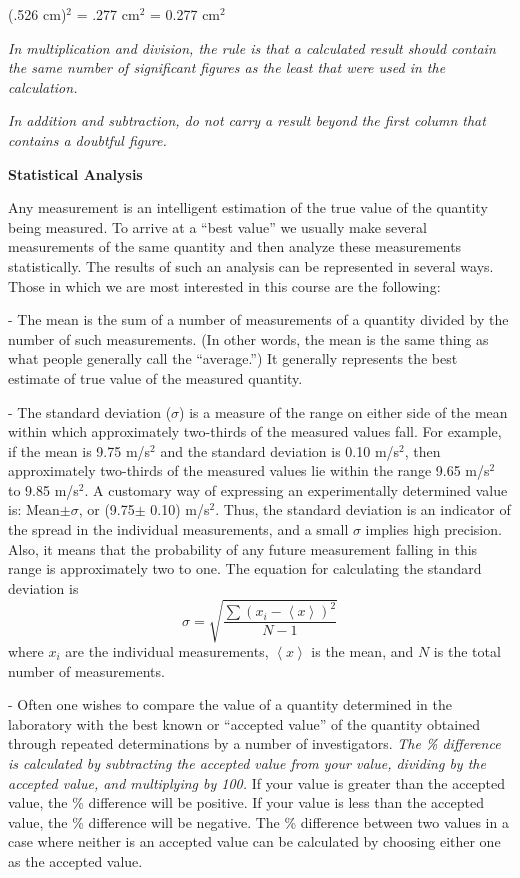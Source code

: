 {\par\centering (.526 cm)\( ^{2} \) = .277 cm\( ^{2} \)
= 0.277 cm\( ^{2} \)\par}

\textit{In multiplication and division, the rule is that a calculated result
should contain the same number of significant figures as the least that were
used in the calculation.}

\textit{In addition and subtraction, do not carry a result beyond the first
column that contains a doubtful figure.}

\textbf{Statistical Analysis} 

Any measurement is an intelligent estimation of the true value of the quantity
being measured. To arrive at a ``best value'' we usually make
several measurements of the same quantity and then analyze these measurements
statistically. The results of such an analysis can be represented in several
ways. Those in which we are most interested in this course are the following:

 - The mean is the sum of a number of measurements of a quantity
divided by the number of such measurements.
(In other words, the mean is the same thing as what people
generally call the ``average.'')
It generally represents the best estimate
of true value of the measured quantity. 

 - The standard deviation (\( \sigma  \)) is a
measure of the range on either side of the mean within which approximately two-thirds
of the measured values fall. For example, if the mean is 9.75 m/s\( ^{2} \)
and the standard deviation is 0.10 m/s\( ^{2} \), then approximately two-thirds
of the measured values lie within the range 9.65 m/s\( ^{2} \) to 9.85 m/s\( ^{2} \).
A customary way of expressing an experimentally determined value is: Mean\( \pm  \)\( \sigma  \),
or (9.75\( \pm  \) 0.10) m/s\( ^{2} \). Thus, the standard deviation is an
indicator of the spread in the individual measurements, and a small \( \sigma  \)
implies high precision. Also, it means that the probability of any future measurement
falling in this range is approximately two to one. The equation for calculating
the standard deviation is
\[
\sigma =\sqrt{\frac{\sum \left( x_{i}-\left\langle x\right\rangle \right) ^{2}}{N-1}}\]
 where \( x_{i} \) are the individual measurements, \( \left\langle x\right\rangle  \)
is the mean, and $N$ is the total number of measurements.

 - Often one wishes to compare the value of a quantity
determined in the laboratory with the best known or ``accepted value''
of the quantity obtained through repeated determinations by a number of investigators.
\textit{The \% difference is calculated by subtracting the accepted value from
your value, dividing by the accepted value, and multiplying by 100.} If your
value is greater than the accepted value, the \% difference will be positive.
If your value is less than the accepted value, the \% difference will be negative.
The \% difference between two values in a case where neither is an accepted
value can be calculated by choosing either one as the accepted value.

